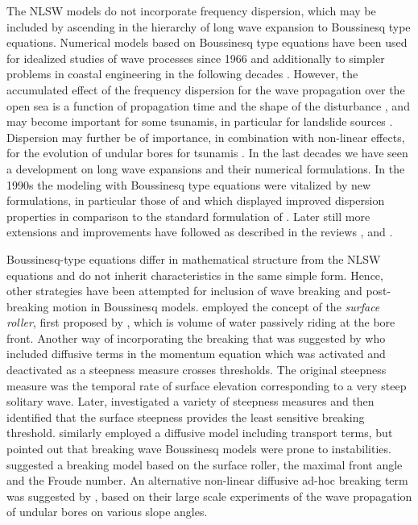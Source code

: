 \documentclass[review]{elsarticle}
\begin{document}
The  NLSW models do not incorporate frequency dispersion, which may be included by ascending in the hierarchy of long wave expansion 
to Boussinesq type equations. 
Numerical models based on Boussinesq type equations have been used
for idealized studies of wave processes since 1966 \citep{Peregrine:1966} and 
additionally to simpler problems in coastal engineering in the following decades \citep{Brocchini:2013}. 
However, the accumulated effect of the frequency dispersion for the wave propagation over the open sea is 
a function of propagation time and the shape of the disturbance \citep{Glimsdal2013},
and may become important for some tsunamis, in particular for landslide sources \citep{Lovholt2015}. 
Dispersion may further be of importance, in combination with non-linear effects,
for the evolution of undular bores for tsunamis \citep{Glimsdal2013,Grue:2008,Lovholt:2008b,Behrens2015}.
In the last decades we have seen a development on long wave expansions and their numerical formulations. 
In the 1990s the modeling with  Boussinesq type equations were vitalized by 
new formulations, in particular those of  \cite{madsen1992new} and \cite{nwogu1993alternative} which  displayed improved dispersion properties in comparison to the standard formulation of \cite{peregrine1967long}.
Later still more extensions and improvements have followed as described in the reviews \cite{Madsen:2003a}, \cite{Brocchini:2013} and \cite{Kirby:2016}.

 Boussinesq-type equations differ in mathematical structure from the NLSW equations and do not
inherit characteristics in the same simple form. Hence, other strategies have been attempted for inclusion of wave breaking and  
post-breaking motion in Boussinesq models. 
\citet{schaffer1993boussinesq} employed the concept of the {\em surface roller},
first proposed by \citet{Svendsen:1984}, 
which is volume of water passively riding at
the bore front.
 Another way of incorporating the breaking that was suggested by \cite{Kennedy2000} who included diffusive terms
in the momentum equation which was activated and deactivated as a steepness measure crosses thresholds. The original steepness measure was the temporal rate of surface elevation corresponding to a very steep solitary wave.
Later, \citet{lynett2006nearshore} investigated a variety of steepness measures and
then identified that the surface steepness provides 
the least sensitive breaking threshold. 
 \citet{Lovholt:2013a} similarly employed a diffusive model including transport terms, but pointed out that breaking wave Boussinesq models were prone to instabilities. 
 \citet{tissier2012new} suggested
a breaking  model based on the surface roller, the maximal front angle and the Froude number.
An alternative non-linear diffusive ad-hoc breaking term was suggested by \citet{matsuyama2007study},
based on their large scale experiments of the wave propagation of undular bores on various slope angles. 
\end{document}
